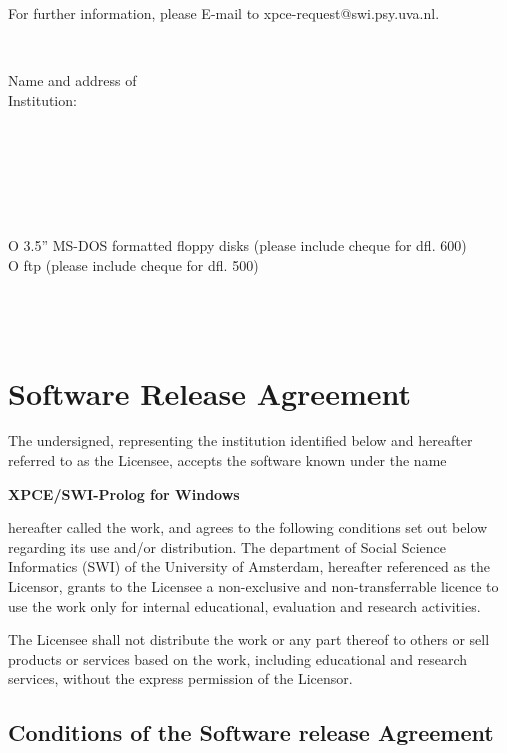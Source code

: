 For further information, please E-mail to xpce-request@swi.psy.uva.nl.

\newlength{\tag}
\settowidth{\tag}{Authorised Signature: }
\newlength{\rest}
\setlength{\rest}{\textwidth}
\addtolength{\rest}{-\tag}

\newcommand{\fillin}{\dotfill\mbox{}}
\newcommand{\onlydots}{\mbox{}\fillin}
\newcommand{\next}{\\[2mm]}

\vspace{0.5cm}
\fillin \next
\parbox[t]{\tag}{Name and address of \\ Institution:}%
\parbox[t]{\rest}{\onlydots \next \onlydots \next \onlydots} \next
{}\fillin \next
{}\fillin \next
{}O 3.5'' MS-DOS formatted floppy disks (please include cheque for dfl. 600) \\
\makebox[\tag][l]{\mbox{}}O ftp (please include cheque for dfl. 500) \next
{}\fillin \next
{}\fillin \next
{}\fillin \\


\section*{Software Release Agreement}

The undersigned, representing the institution identified below and
hereafter referred to as the Licensee, accepts the software known under
the name

\vspace{2mm}
\centerline{\bf XPCE/SWI-Prolog for Windows}
\vspace{2mm}

hereafter called the work, and agrees to the following conditions set
out below regarding its use and/or distribution.  The department of
Social Science Informatics (SWI) of the University of Amsterdam,
hereafter referenced as the Licensor, grants to the Licensee a
non-exclusive and non-transferrable licence to use the work only for
internal educational, evaluation and research activities.

The Licensee shall not distribute the work or any part thereof to others
or sell products or services based on the work, including educational
and research services, without the express permission of the Licensor.

\subsection*{Conditions of the Software release Agreement}

